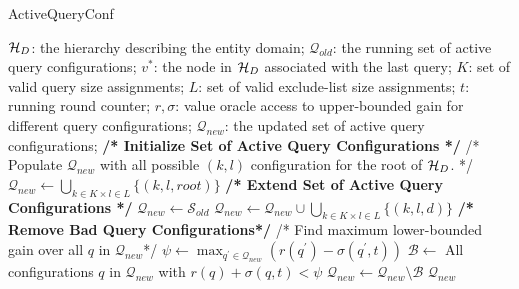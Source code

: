 \begin{algorithm}[h]
\small\caption{ActiveQueryConf}
\label{algo:updateactions}
\begin{algorithmic}[1]
 $\mathcal{H}_D$: the hierarchy describing the entity domain; $\mathcal{Q}_{old}$: the running set of active query configurations; $v^*$: the node in $\mathcal{H}_D$ associated with the last query; $K$: set of valid query size assignments; $L$: set of valid exclude-list size assignments; $t$: running round counter; $r,\sigma$: value oracle access to upper-bounded gain for different query configurations;
 $\mathcal{Q}_{new}$: the updated set of active query configurations;
	\STATE \textbf{/* Initialize Set of Active Query Configurations */}
	\STATE /* Populate ${\mathcal{Q}_{new}}$ with all possible $(k,l)$ configuration for the root of $\mathcal{H}_D$. */
	\STATE ${\mathcal{Q}_{new}} \leftarrow \bigcup_{k \in K \times l \in L} \{ (k,l,root) \}$
\ELSE
	\STATE \textbf{/* Extend Set of Active Query Configurations */}
	\STATE $\mathcal{Q}_{new} \leftarrow \mathcal{S}_{old}$
	\STATE $\mathcal{Q}_{new} \leftarrow \mathcal{Q}_{new} \cup \bigcup_{k \in K \times l \in L} \{(k,l,d)\}$
	\ENDFOR
	\STATE \textbf{/* Remove Bad Query Configurations*/}
	\STATE /* Find maximum lower-bounded gain over all $q$ in $\mathcal{Q}_{new}$*/
	\STATE $\psi \leftarrow \max_{q^{\prime} \in \mathcal{Q}_{new}} (r(q^{\prime}) - \sigma(q^{\prime},t))$  
	\STATE $\mathcal{B} \leftarrow$ All configurations $q$ in $\mathcal{Q}_{new}$ with $r(q) + \sigma(q,t) < \psi$
	\STATE $\mathcal{Q}_{new} \leftarrow \mathcal{Q}_{new} \setminus \mathcal{B}$
\ENDIF 
\RETURN $\mathcal{Q}_{new}$
\end{algorithmic}
\end{algorithm}
\vspace{-5pt}
